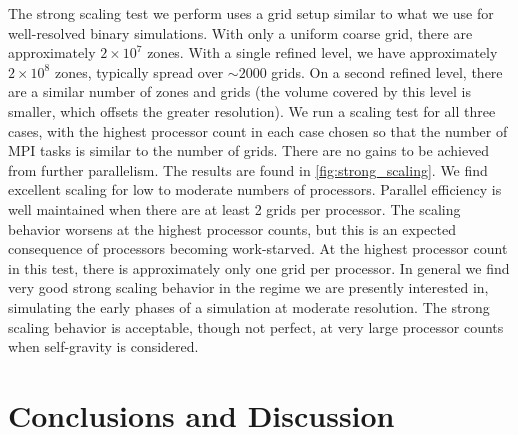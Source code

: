 \documentclass[iop]{../emulateapj}
\begin{document}
The strong scaling test we perform uses a grid setup similar to what we 
use for well-resolved binary simulations. With only a uniform coarse grid, 
there are approximately $2 \times 10^7$ zones. With a single refined level, 
we have approximately $2 \times 10^8$ zones, typically spread over $\sim 2000$ grids.
On a second refined level, there are a similar number of zones and grids 
(the volume covered by this level is smaller, which offsets the greater resolution).
We run a scaling test for all three cases, with the 
highest processor count in each case chosen so that the number of 
MPI tasks is similar to the number of grids. There are no gains 
to be achieved from further parallelism. The results are found in 
\autoref{fig:strong_scaling}. We find excellent scaling for low to moderate numbers 
of processors. Parallel efficiency is well maintained when there are 
at least 2 grids per processor. The 
scaling behavior worsens at the highest processor counts, but this is 
an expected consequence of processors becoming work-starved. At the highest 
processor count in this test, there is approximately only one grid per processor. In general 
we find very good strong scaling behavior in the regime we are presently 
interested in, simulating the early phases of a simulation at moderate 
resolution. The strong scaling behavior is acceptable, though not perfect, 
at very large processor counts when self-gravity is considered.

\section{Conclusions and Discussion}\label{sec:Conclusions and Discussion}
\end{document}
